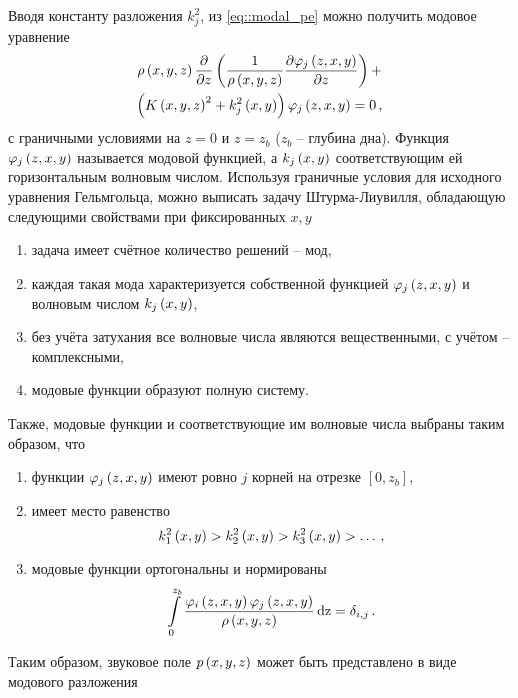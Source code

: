 \documentclass[../document.tex]{subfiles}
\begin{document}
            Вводя константу разложения $k_j^2$, из \eqref{eq::modal_pe} можно получить модовое уравнение
            \begin{multline}
                \rho\left(x,y,z\right)\frac{\partial}{\partial z}\left(\frac{1}{\rho\left(x,y,z\right)}\frac{\partial\varphi_j\left(z,x,y\right)}{\partial z}\right)+\\
                \left(K\left(x,y,z\right)^2+k_j^2\left(x,y\right)\right)\varphi_j\left(z,x,y\right)=0\,,
            \end{multline}
            с граничными условиями на $z=0$ и $z=z_b$ ($z_b$ -- глубина дна). Функция $\varphi_j\left(z,x,y\right)$ называется модовой функцией, а $k_j\left(x,y\right)$ соответствующим ей горизонтальным волновым числом. Используя граничные условия для исходного уравнения Гельмгольца, можно выписать задачу Штурма-Лиувилля, обладающую следующими свойствами при фиксированных $x,y$
            \begin{enumerate}
                \item задача имеет счётное количество решений -- мод,
                \item каждая такая мода характеризуется собственной функцией $\varphi_j\left(z,x,y\right)$ и волновым числом $k_j\left(x,y\right)$,
                \item без учёта затухания все волновые числа являются вещественными, с учётом -- комплексными,
                \item модовые функции образуют полную систему.
            \end{enumerate}
            Также, модовые функции и соответствующие им волновые числа выбраны таким образом, что
            \begin{enumerate}
                \item функции $\varphi_j\left(z,x,y\right)$ имеют ровно $j$ корней на отрезке $\left[0,z_b\right]$,
                \item имеет место равенство
                \begin{equation}
                    k_1^2\left(x,y\right)>k_2^2\left(x,y\right)>k_3^2\left(x,y\right)>\dots\,,
                \end{equation}
                \item модовые функции ортогональны и нормированы
                \begin{equation}
                    \int\limits_0^{z_b}\frac{\varphi_i\left(z,x,y\right)\varphi_j\left(z,x,y\right)}{\rho\left(x,y,z\right)}\operatorname{dz}=\delta_{i,j}\,.
                \end{equation}
            \end{enumerate}
            Таким образом, звуковое поле $p\left(x,y,z\right)$ может быть представлено в виде модового разложения
\end{document}
